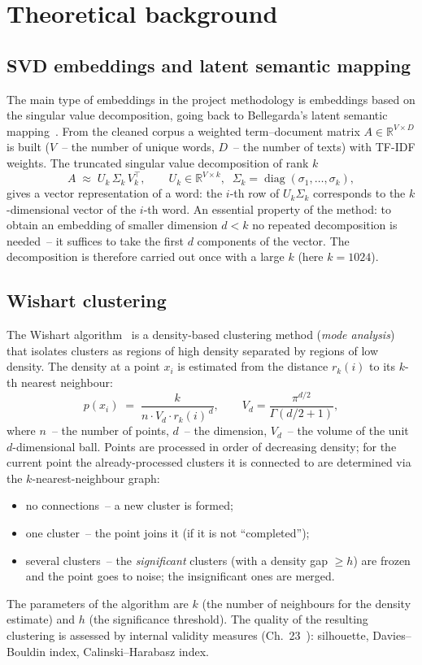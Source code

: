 \documentclass[12pt,a4paper]{article}
\begin{document}
\section{Theoretical background}

\subsection{SVD embeddings and latent semantic mapping}

The main type of embeddings in the project methodology is embeddings based on
the singular value decomposition, going back to Bellegarda's latent semantic
mapping~\cite{bellegarda2005}. From the cleaned corpus a weighted
term--document matrix $A\in\mathbb{R}^{V\times D}$ is built ($V$~-- the number of
unique words, $D$~-- the number of texts) with TF-IDF weights. The truncated
singular value decomposition of rank $k$
\[
  A \;\approx\; U_k\,\Sigma_k\,V_k^{\top},\qquad
  U_k\in\mathbb{R}^{V\times k},\;\;
  \Sigma_k=\operatorname{diag}(\sigma_1,\dots,\sigma_k),
\]
gives a vector representation of a word: the $i$-th row of $U_k\Sigma_k$
corresponds to the $k$-dimensional vector of the $i$-th word. An essential
property of the method: to obtain an embedding of smaller dimension $d<k$ no
repeated decomposition is needed~-- it suffices to take the first $d$ components
of the vector. The decomposition is therefore carried out once with a large $k$
(here $k=1024$).

\subsection{Wishart clustering}

The Wishart algorithm~\cite{wishart1969} is a density-based clustering method
(\emph{mode analysis}) that isolates clusters as regions of high density
separated by regions of low density. The density at a point $x_i$ is estimated
from the distance $r_k(i)$ to its $k$-th nearest neighbour:
\[
  p(x_i) \;=\; \frac{k}{n\cdot V_d\cdot r_k(i)^{\,d}},
  \qquad
  V_d=\frac{\pi^{d/2}}{\Gamma(d/2+1)},
\]
where $n$~-- the number of points, $d$~-- the dimension, $V_d$~-- the volume of
the unit $d$-dimensional ball. Points are processed in order of decreasing
density; for the current point the already-processed clusters it is connected to
are determined via the $k$-nearest-neighbour graph:
\begin{itemize}[nosep]
  \item no connections~-- a new cluster is formed;
  \item one cluster~-- the point joins it (if it is not ``completed'');
  \item several clusters~-- the \emph{significant} clusters (with a density gap
        $\ge h$) are frozen and the point goes to noise; the insignificant ones
        are merged.
\end{itemize}
The parameters of the algorithm are $k$ (the number of neighbours for the
density estimate) and $h$ (the significance threshold). The quality of the
resulting clustering is assessed by internal validity measures
(Ch.~23~\cite{aggarwal2013}): silhouette, Davies--Bouldin index,
Calinski--Harabasz index.
\end{document}
